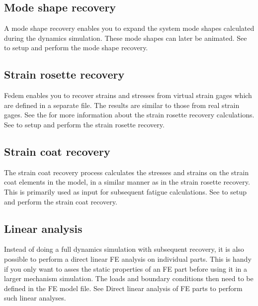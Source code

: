 \clearpage


\subsection{Mode shape recovery}

A mode shape recovery enables you to expand the system mode shapes
calculated during the dynamics simulation.
These mode shapes can later be animated.
See 
to setup and perform the mode shape recovery.


\subsection{Strain rosette recovery}

Fedem enables you to recover strains and stresses from virtual strain gages
which are defined in a separate file.
The results are similar to those from real strain gages.
See the 
for more information about the strain rosette recovery calculations.
See 
to setup and perform the strain rosette recovery.


\subsection{Strain coat recovery}

The strain coat recovery process calculates the stresses and strains
on the strain coat elements in the model,
in a similar manner as in the strain rosette recovery.
This is primarily used as input for subsequent fatigue calculations.
See 
to setup and perform the strain coat recovery.


\subsection{Linear analysis}

Instead of doing a full dynamics simulation with subsequent recovery,
it is also possible to perform a direct linear FE analysis on individual parts.
This is handy if you only want to asses the static properties of an FE part
before using it in a larger mechanism simulation.
The loads and boundary conditions then need to be defined in the FE model file.
See 
{Direct linear analysis of FE parts} to perform such linear analyses.


